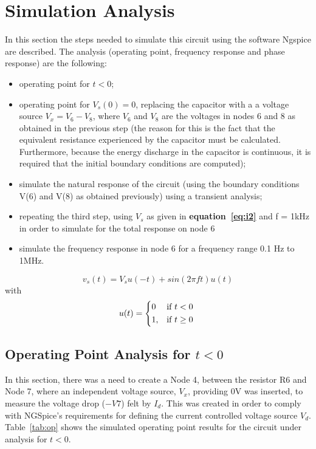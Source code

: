 \section{Simulation Analysis}
\label{sec:simulation}
In this section the steps needed to simulate this circuit using the software Ngspice are described. The analysis (operating point, frequency response and phase response) are the following:
\begin{itemize} 
	\item operating point for $t<0$;
	\item operating point for  $V_s(0) = 0$, replacing the capacitor with a a voltage source $V_x = V_6 - V_8$, where $V_6$ and $V_8$ are the voltages in nodes 6 and 8 as obtained in the previous step (the reason for this is the fact that the equivalent resistance experienced by the capacitor must be calculated. Furthermore, because the energy discharge in the capacitor is continuous, it is required that the initial boundary conditions are computed);
	\item simulate the natural response of the circuit (using the boundary conditions V(6) and V(8) as obtained previously) using a transient analysis;
	\item repeating the third step, using {\it $V_s$} as given in \textbf{equation~\ref{eq:i2}} and f = 1kHz  in order to simulate for the total response on node 6
	\item simulate the frequency response in node 6 for a frequency range 0.1 Hz to 1MHz.
\end{itemize}
\begin {equation}
	v_s( t)  = V_s u(-t) + sin( 2 \pi f t ) u( t)
	\label{eq:i1}
\end{equation}
 with 
\begin {equation}
	u( t ) =  
	\begin{cases*} 
	  0 & if $t < 0$ \\
	1, & if $t \geq 0$
	\end{cases*}
	\label{eq:i31}  
\end{equation}
\pagebreak
\subsection{Operating Point Analysis for $t<0$}
In this section, there was a need to create a Node 4, between the resistor R6 and Node 7, where an independent voltage source, $V_x$, providing 0V was inserted, to measure the voltage drop ($-V7$) felt by $I_d$. This was created in order to comply with NGSpice's requirements for defining the current controlled voltage source $V_d$.
Table~\ref{tab:op} shows the simulated operating point results for the circuit
under analysis for $t<0$.


